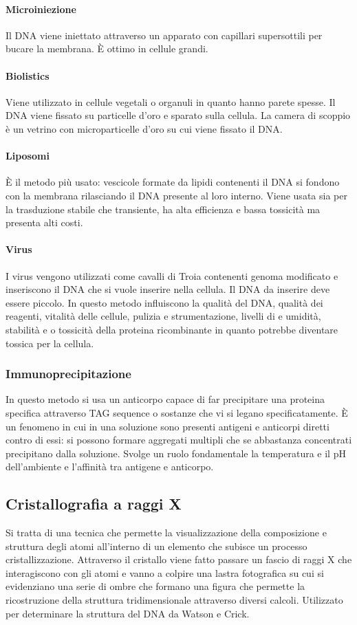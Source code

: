 \paragraph{Microiniezione}
Il DNA viene iniettato attraverso un apparato con capillari supersottili per bucare la membrana. \`E ottimo in cellule grandi.
\paragraph{Biolistics}
Viene utilizzato in cellule vegetali o organuli in quanto hanno parete spesse. Il DNA viene fissato su particelle d'oro e sparato sulla cellula. La camera di scoppio \`e un vetrino con
microparticelle d'oro su cui viene fissato il DNA. 
\paragraph{Liposomi}
\`E il metodo pi\`u usato: vescicole formate da lipidi contenenti il DNA si fondono con la membrana rilasciando il DNA presente al loro interno. Viene usata sia per la trasduzione 
stabile che transiente, ha alta efficienza e bassa tossicit\`a ma presenta alti costi.
\paragraph{Virus}
I virus vengono utilizzati come cavalli di Troia contenenti genoma modificato e inseriscono il DNA che si vuole inserire nella cellula. Il DNA da inserire deve essere piccolo. In questo
metodo influiscono la qualit\`a del DNA, qualit\`a dei reagenti, vitalit\`a delle cellule, pulizia e strumentazione, livelli di  e umidit\`a, stabilit\`a e o tossicit\`a della
proteina ricombinante in quanto potrebbe diventare tossica per la cellula. 
\subsubsection{Immunoprecipitazione}
In questo metodo si usa un anticorpo capace di far precipitare una proteina specifica attraverso TAG sequence o sostanze che vi si legano specificatamente. \`E un fenomeno in cui in
una soluzione sono presenti antigeni e anticorpi diretti contro di essi: si possono formare aggregati  multipli che se abbastanza concentrati precipitano dalla soluzione. Svolge un ruolo
fondamentale la temperatura e il pH dell'ambiente e l'affinit\`a tra antigene e anticorpo. 
\subsection{Cristallografia a raggi X}
Si tratta di una tecnica che permette la visualizzazione della composizione e struttura degli atomi all'interno di un elemento che subisce un processo cristallizzazione. Attraverso il 
cristallo viene fatto passare un fascio di raggi X che interagiscono con gli atomi e vanno a colpire una lastra fotografica su cui si evidenziano una serie di ombre che formano una
figura che permette la ricostruzione della struttura tridimensionale attraverso diversi calcoli. Utilizzato per determinare la struttura del DNA da Watson e Crick. 
